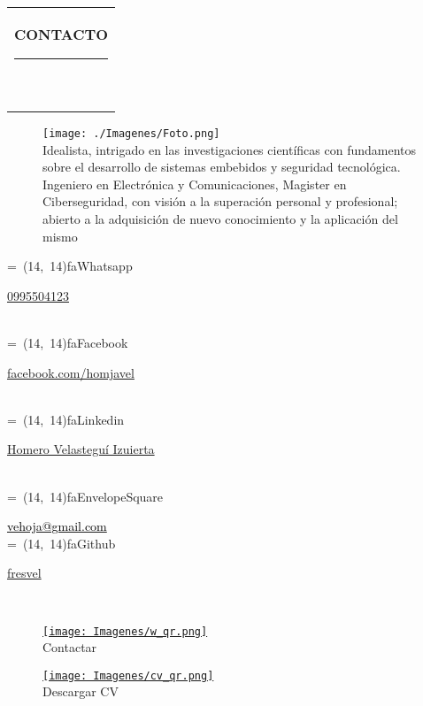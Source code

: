 \documentclass[10pt,A4]{article}
\newcommand*{\vcenteredhbox}[1]{\begingroup
\setbox0=\hbox{#1}\parbox{\wd0}{\box0}\endgroup}
\newcommand{\icon}[3] { 							
	\makebox(#2, #2){\textcolor{maincol}{\csname fa#1\endcsname}}
}
\newcommand{\icontext}[4]{ 						
	\vcenteredhbox{\icon{#1}{#2}{#3}}  \hspace{2pt}  \parbox{0.9\mpwidth}{\textcolor{#4}{#3}}
}
\newcommand{\iconemail}[5]{ 						
    \vcenteredhbox{\icon{#1}{#2}{#5}}  \hspace{2pt} \href{mailto:#4}{\textcolor{#5}{#3}}
}
\newcommand{\mpwidth}{\linewidth-\fboxsep-\fboxsep}
\newcommand{\cvtext}[1] {
	\begin{tabular*}{1\mpwidth}{p{0.98\mpwidth}}
		\parbox{1\mpwidth}{#1}
	\end{tabular*}
}
\newcommand{\cvsection}[1] {
	\vspace{14pt}
	\cvtext{
		\textbf{\LARGE{\textcolor{darkcol}{\uppercase{#1}}}}\\[-4pt]
		\textcolor{maincol}{ \rule{0.1\textwidth}{2pt} } \\
	}
}
\newcommand{\cvqrcode}[1] {
	\begin{center}
		\texttt{[image: qrcode]}
	\end{center}
}
\begin{document}
\setlength{\columnsep}{2.2em}
\setlength{\columnseprule}{4pt}
\begin{paracol}{2}
\begin{leftcolumn}



\cvsection{CONTACTO}
	
\begin{figure}
    \centering
    \texttt{[image: ./Imagenes/Foto.png]}\\
    \justifying\normalsize
    Idealista, intrigado en las investigaciones científicas con fundamentos sobre el desarrollo de sistemas embebidos y seguridad tecnológica. Ingeniero en Electrónica y Comunicaciones, Magister en Ciberseguridad, con visión a la superación personal y profesional; abierto a la adquisición de nuevo conocimiento y la aplicación del mismo
\end{figure}

\icontext{Whatsapp}{14}{\href{https://wa.me/59305504123}{0995504123}}{black}\\[6pt]
\icontext{Facebook}{14}{\href{https://web.facebook.com/homjavel}{facebook.com/homjavel}}{black}\\[6pt]
\icontext{Linkedin}{14}{\href{https://www.linkedin.com/in/homero-velastegu\%C3\%AD-izurieta-8b7950160/}{Homero Velasteguí Izuierta}}{black}\\[6pt]
\iconemail{EnvelopeSquare}{14}{vehoja@gmail.com}{vehoja@gmail.com}{black}\\[6pt]
\icontext{Github}{14}{\href{https://github.com/fresvel}{fresvel}}{black}\\[6pt]
\vfill\null

\begin{figure}[b]
    \centering
    \href{https://wa.me/59305504123}{\texttt{[image: Imagenes/w\_qr.png]}}
    \\ {Contactar}
    
\end{figure}




\begin{figure}
    \centering
    \href{https://mega.nz/file/dWp31RrK#z9XoP_M5yQvO3shsg4i-p4wTlL0G3Oc5KjafktydL9M}{\texttt{[image: Imagenes/cv\_qr.png]}}
    \\ {Descargar CV}
\end{figure}


\end{leftcolumn}
\end{paracol}
\end{document}
